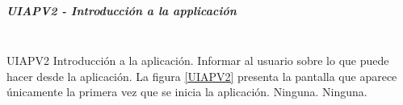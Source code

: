 \subparagraph{UIAPV2 - Introducción a la applicación} ~\\

{UIAPV2} %
{Introducción a la aplicación.}  %
{Informar al usuario sobre lo que puede hacer desde la aplicación.} %
{La figura \ref{UIAPV2} presenta la pantalla que aparece únicamente la primera vez que se inicia la aplicación.} %
{Ninguna.} %
{Ninguna.} %


